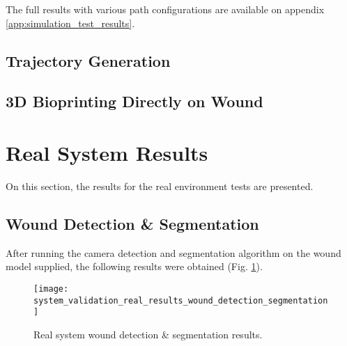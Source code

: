The full results with various path configurations are available on appendix \ref{app:simulation_test_results}.


\subsection{Trajectory Generation}
\label{subsec:simulated_system_results_trajectory_generation}


\subsection{3D Bioprinting Directly on Wound}
\label{subsec:simulated_system_results_bioprinting_directly_wound}




\section{Real System Results}
\label{sec:system_validation_real_results}

On this section, the results for the real environment tests are presented.

\subsection{Wound Detection \& Segmentation}
\label{subsec:real_system_results_wound_detection_segmentation}

After running the camera detection and segmentation algorithm on the wound model supplied, the following results were obtained (Fig. \ref{fig:system_validation_real_results_wound_detection_segmentation}).\\

\begin{figure}[htbp]
	\centering
	\texttt{[image: system\_validation\_real\_results\_wound\_detection\_segmentation]}
	\caption{Real system wound detection \& segmentation results.}
	\label{fig:system_validation_real_results_wound_detection_segmentation}
\end{figure}

